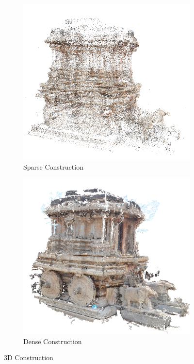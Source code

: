 \documentclass{article}
\begin{document}
		\begin{figure}[ht!]
			\centering
			\begin{subfigure}{.5\textwidth}
			  	\centering
			  	\includegraphics[width=1.0\linewidth]{sparse_chariot.png}
			  	\caption{Sparse Construction}
			  	\label{fig:sub1}
			\end{subfigure}%
			\begin{subfigure}{.5\textwidth}
			  	\centering
			  	\includegraphics[width=1.0\linewidth]{dense_chariot.png}
			  	\caption{Dense Construction}
			  	\label{fig:sub2}
			\end{subfigure}
			\caption{3D Construction}
			\label{figstart}
		\end{figure}
\end{document}
